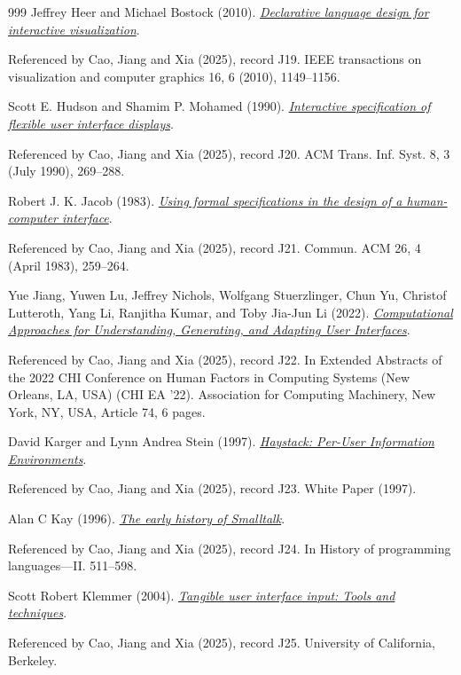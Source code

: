 \documentclass[11pt,letterpaper]{article}
\begin{document}
\begin{thebibliography}{999}
Jeffrey Heer and Michael Bostock (2010).
\href{https://idl.uw.edu/papers/protovis-design}{\emph{Declarative language design for interactive visualization}}.
\par {\small Referenced by Cao, Jiang and Xia (2025), record J19. IEEE transactions on visualization and computer graphics 16, 6 (2010), 1149–1156.}

Scott E. Hudson and Shamim P. Mohamed (1990).
\href{https://doi.org/10.1145/98188.98201}{\emph{Interactive specification of flexible user interface displays}}.
\par {\small Referenced by Cao, Jiang and Xia (2025), record J20. ACM Trans. Inf. Syst. 8, 3 (July 1990), 269–288.}

Robert J. K. Jacob (1983).
\href{https://doi.org/10.1145/2163.358093}{\emph{Using formal specifications in the design of a human-computer interface}}.
\par {\small Referenced by Cao, Jiang and Xia (2025), record J21. Commun. ACM 26, 4 (April 1983), 259–264.}

Yue Jiang, Yuwen Lu, Jeffrey Nichols, Wolfgang Stuerzlinger, Chun Yu, Christof Lutteroth, Yang Li, Ranjitha Kumar, and Toby Jia-Jun Li (2022).
\href{https://doi.org/10.1145/3491101.3504030}{\emph{Computational Approaches for Understanding, Generating, and Adapting User Interfaces}}.
\par {\small Referenced by Cao, Jiang and Xia (2025), record J22. In Extended Abstracts of the 2022 CHI Conference on Human Factors in Computing Systems (New Orleans, LA, USA) (CHI EA ’22). Association for Computing Machinery, New York, NY, USA, Article 74, 6 pages.}

David Karger and Lynn Andrea Stein (1997).
\href{https://arxiv.org/html/2503.04084v1\#bib.bib24}{\emph{Haystack: Per-User Information Environments}}.
\par {\small Referenced by Cao, Jiang and Xia (2025), record J23. White Paper (1997).}

Alan C Kay (1996).
\href{https://ics.uci.edu/~jajones/INF102-S18/readings/11_KaySmalltalkHistory.pdf}{\emph{The early history of Smalltalk}}.
\par {\small Referenced by Cao, Jiang and Xia (2025), record J24. In History of programming languages—II. 511–598.}

Scott Robert Klemmer (2004).
\href{https://arxiv.org/html/2503.04084v1\#bib.bib26}{\emph{Tangible user interface input: Tools and techniques}}.
\par {\small Referenced by Cao, Jiang and Xia (2025), record J25. University of California, Berkeley.}


\end{thebibliography}
\end{document}
